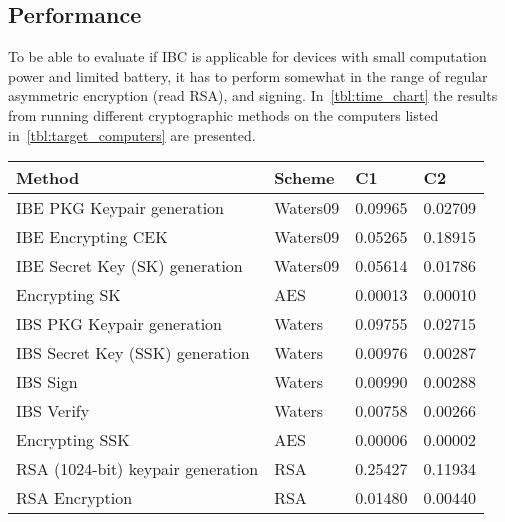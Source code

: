\subsection{Performance}\label{ibc-performance}
To be able to evaluate if \gls{IBC} is applicable for devices with small computation power and limited battery, it has to perform somewhat in the range of regular asymmetric encryption (read RSA), and signing. 
In~\autoref{tbl:time_chart} the results from running different cryptographic methods on the computers listed in~\autoref{tbl:target_computers} are presented.

\begin{table}[h]
  \begin{tabular}{llll}
  Method                                      & Scheme          & C1                   & C2                   \\ \hline
  IBE PKG Keypair generation                  & Waters09        & 0.09965              & 0.02709              \\ %
  IBE Encrypting CEK                          & Waters09        & 0.05265              & 0.18915              \\ %
  IBE Secret Key (SK) generation              & Waters09        & 0.05614              & 0.01786              \\ %
  Encrypting SK                               & AES             & 0.00013              & 0.00010              \\ %
  IBS PKG Keypair generation                  & Waters          & 0.09755              & 0.02715              \\ %
  IBS Secret Key (SSK) generation             & Waters          & 0.00976              & 0.00287              \\ %
  IBS Sign                                    & Waters          & 0.00990              & 0.00288              \\ %
  IBS Verify                                  & Waters          & 0.00758              & 0.00266              \\ %
  Encrypting SSK                              & AES             & 0.00006              & 0.00002              \\ %
  RSA (1024-bit) keypair generation           & RSA             & 0.25427              & 0.11934              \\ %
  RSA Encryption                              & RSA             & 0.01480              & 0.00440              \\ %

\end{tabular}
\end{table}
